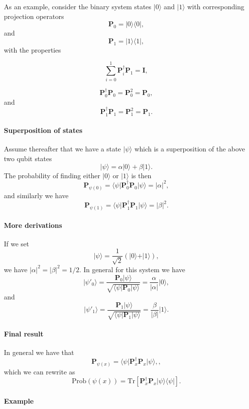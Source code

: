As an example, consider the binary system states $\vert 0\rangle$ and $\vert 1\rangle$ with corresponding projection operators
\[
\bm{P}_0 =\vert 0 \rangle \langle 0\vert,
\]
and 
\[
\bm{P}_1 =\vert 1 \rangle \langle 1\vert,
\]
with the properties

\[
\sum_{i=0}^1\bm{P}_i^{\dagger}\bm{P}_1=\bm{I},
\]

\[
\bm{P}_0^{\dagger}\bm{P}_0=\bm{P}_0^2=\bm{P}_0,
\]
and
\[
\bm{P}_1^{\dagger}\bm{P}_1=\bm{P}_1^2=\bm{P}_1.
\]


\paragraph{Superposition of states}

Assume thereafter that we have a state $\vert \psi\rangle$ which is a superposition of the above two qubit states
\[
\vert \psi \rangle = \alpha\vert 0 \rangle + \beta \vert 1\rangle.
\]
The probability of finding either $\vert 0\rangle$ or $\vert 1\rangle$ is then
\[
\bm{P}_{\psi(0)}=\langle \psi\vert \bm{P}_0^{\dagger}\bm{P}_0\vert \psi\rangle=\vert \alpha\vert^2,
\]
and similarly we have 
\[
\bm{P}_{\psi(1)}=\langle \psi\vert \bm{P}_1^{\dagger}\bm{P}_1\vert \psi\rangle=\vert \beta\vert^2.
\]

\paragraph{More derivations}

If we set 
\[
\vert \psi \rangle = \frac{1}{\sqrt{2}}\left(\vert 0 \rangle + \vert 1\rangle\right),
\]
we have $\vert \alpha\vert^2=\vert \beta\vert^2=1/2$. In general for this system we have
\[
\vert \psi'_0\rangle = \frac{\bm{P}_0\vert \psi\rangle}{\sqrt{\langle \psi \vert \bm{P}_0\vert \psi\rangle}}=\frac{\alpha}{\vert \alpha\vert}\vert 0 \rangle,
\]
and
\[
\vert \psi'_1\rangle = \frac{\bm{P}_1\vert \psi\rangle}{\sqrt{\langle \psi \vert \bm{P}_1\vert \psi\rangle}}=\frac{\beta}{\vert \beta\vert}\vert 1 \rangle. 
\]


\paragraph{Final result}
In general we have that 
\[
\bm{P}_{\psi(x)}=\langle \psi\vert \bm{P}_x^{\dagger}\bm{P}_x\vert \psi\rangle,,
\]
which we can rewrite as
\[
\mathrm{Prob}(\psi(x))=\mathrm{Tr}\left[\bm{P}_x^{\dagger}\bm{P}_x\vert \psi\rangle\langle \psi\vert\right].
\]


\paragraph{Example}

